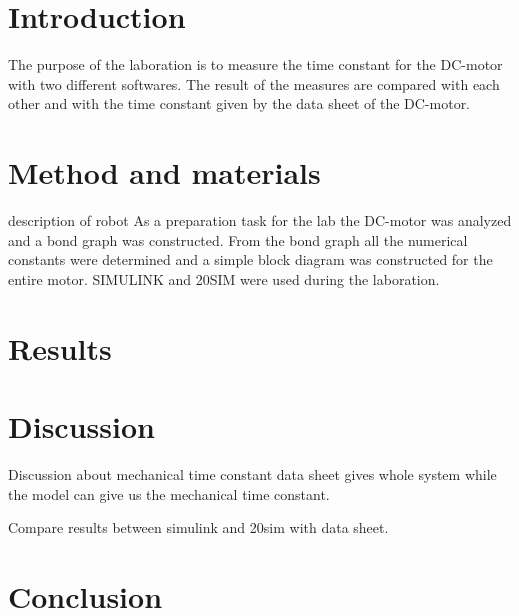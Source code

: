 \documentclass[12pt,a4paper]{article}
\begin{document}
\newpage

\tableofcontents

\newpage

\section{Introduction}
The purpose of the laboration is to measure the time constant for the DC-motor with two different softwares. The result of the measures are compared with each other and with the time constant given by the data sheet of the DC-motor.

\section{Method and materials}
description of robot
As a preparation task for the lab the DC-motor was analyzed and a bond graph was constructed. From the bond graph all the numerical constants were determined and a simple block diagram was constructed for the entire motor.
SIMULINK and 20SIM were used during the laboration.
\lipsum[4]

\section{Results}
\lipsum[4]

\section{Discussion}
Discussion about mechanical time constant data sheet gives whole system while the model can give us the mechanical time constant.

Compare results between simulink and 20sim with data sheet.
\lipsum[4]

\section{Conclusion}
\lipsum[4]

\begin{thebibliography}{99}

\end{thebibliography}
\end{document}

